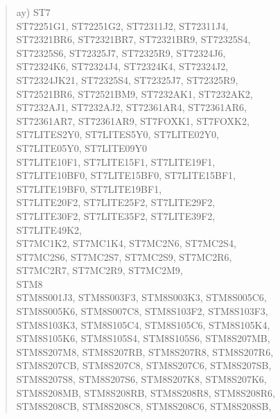 \documentclass[12pt,a4paper,twoside]{report}
\begin{document}
\begin{quote}
ay) ST7 \\
    ST72251G1, ST72251G2, ST72311J2, ST72311J4, \\
    ST72321BR6, ST72321BR7, ST72321BR9, ST72325S4, \\
    ST72325S6, ST72325J7, ST72325R9, ST72324J6, \\
    ST72324K6, ST72324J4, ST72324K4, ST72324J2, \\
    ST72324JK21, ST72325S4, ST72325J7, ST72325R9, \\
    ST72521BR6, ST72521BM9, ST7232AK1, ST7232AK2, \\
    ST7232AJ1, ST7232AJ2, ST72361AR4, ST72361AR6, \\
    ST72361AR7, ST72361AR9, ST7FOXK1, ST7FOXK2, \\
    ST7LITES2Y0, ST7LITES5Y0, ST7LITE02Y0, \\
    ST7LITE05Y0, ST7LITE09Y0 \\
    ST7LITE10F1, ST7LITE15F1, ST7LITE19F1, \\
    ST7LITE10BF0, ST7LITE15BF0, ST7LITE15BF1, \\
    ST7LITE19BF0, ST7LITE19BF1, \\
    ST7LITE20F2, ST7LITE25F2, ST7LITE29F2, \\
    ST7LITE30F2, ST7LITE35F2, ST7LITE39F2, \\
    ST7LITE49K2, \\
    ST7MC1K2, ST7MC1K4, ST7MC2N6, ST7MC2S4, \\
    ST7MC2S6, ST7MC2S7, ST7MC2S9, ST7MC2R6, \\
    ST7MC2R7, ST7MC2R9, ST7MC2M9, \\
    STM8 \\
    STM8S001J3, STM8S003F3, STM8S003K3, STM8S005C6,\\
    STM8S005K6, STM8S007C8, STM8S103F2, STM8S103F3,\\
    STM8S103K3, STM8S105C4, STM8S105C6, STM8S105K4,\\
    STM8S105K6, STM8S105S4, STM8S105S6, STM8S207MB,\\
    STM8S207M8, STM8S207RB, STM8S207R8, STM8S207R6,\\
    STM8S207CB, STM8S207C8, STM8S207C6, STM8S207SB,\\
    STM8S207S8, STM8S207S6, STM8S207K8, STM8S207K6,\\
    STM8S208MB, STM8S208RB, STM8S208R8, STM8S208R6,\\
    STM8S208CB, STM8S208C8, STM8S208C6, STM8S208SB,\\

\end{quote}
\end{document}
